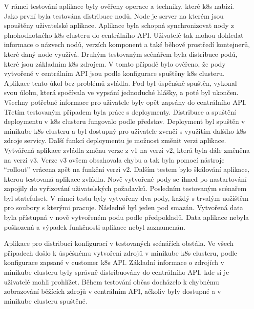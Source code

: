         V rámci testování aplikace byly ověřeny operace a techniky, které k8s nabízí. Jako první byla testována distribuce nodů. Node je server na kterém jsou spouštěny uživatelské aplikace. Aplikace byla schopná synchronizovat nody z plnohodnotného k8s clusteru do centrálního API. Uživatelé tak mohou dohledat informace o názvech nodů, verzích komponent a také běhové prostředí kontejnerů, které daný node využívá. \linebreak Druhým testovaným scénářem byla distribuce podů, které jsou základním k8s zdrojem. V tomto případě bylo ověřeno, že pody vytvořené v centrálním API jsou podle konfigurace spuštěny k8s clusteru. Aplikace tento úkol bez problémů zvládla. Pod byl úspěnšně spuštěn, vykonal svou úlohu, která spočívala ve vypsání jednoduché hlášky, a poté byl ukončen. Všechny potřebné informace pro uživatele byly opět zapsány do centrálního API. Třetím testovaným případem byla práce s deploymenty. Distribuce a spuštění deploymentu v k8s clusteru fungovalo podle představ. Deployment byl spuštěn v minikube k8s clusteru a byl dostupný pro uživatele zvenčí s využitím dalšího k8s zdroje servicy. Další funkcí deploymentu je možnost změnit verzi aplikace. Vytvářená aplikace zvládla změnu verze z v1 na verzi v2, která byla dále změněna \linebreak na verzi v3. Verze v3 ovšem obsahovala chybu a tak byla pomocí nástroje “rollout” vrácena zpět na funkční verzi v2. Dalším testem bylo škálování aplikace, kterou testovaná aplikace zvládla. Nově vytvořené pody se ihned po nastartování zapojily \linebreak do vyřizování uživatelských požadavků. Posledním testovaným scénařem byl statefulset. V rámci testu byly vytvořeny dva pody, každý s trvalým uožištěm pro soubory s kterými pracuje. Následně byl jeden pod smazán. Vytvořená data byla přístupná v nově vytvořeném podu podle předpokladů. Data aplikace nebyla poškozená a výpadek funkčnosti aplikace nebyl zaznamenán.\par
	    Aplikace pro distribuci konfigurací v testovaných scénářích obstála. Ve všech případech došlo k úspěšnému vytvoření zdrojů v minikube k8s clusteru, podle \linebreak konfigurace zapsané v customer k8s API. Základní informace o zdrojích v minikube clusteru byly správně distribuovány do centrálního API, kde si je uživatelé mohli \linebreak prohlížet. Během testování občas docházelo k chybnému zobrazování běžících zdrojů v centrálním API, ačkoliv byly dostupné a v minikube clusteru spuštěné. 

